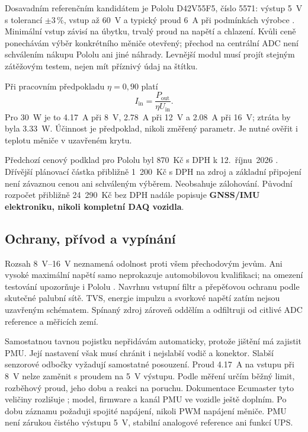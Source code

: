 Dosavadním referenčním kandidátem je Pololu D42V55F5, číslo 5571:
výstup \SI{5}{V} s tolerancí \(\pm3\,\%\), vstup až \SI{60}{V}
a typický proud \SI{6}{A} při podmínkách výrobce
\cite{pololu-d42-integrace}. Minimální vstup závisí na úbytku,
trvalý proud na napětí a chlazení. Kvůli ceně ponechávám výběr
konkrétního měniče otevřený; přechod na centrální ADC není schválením
nákupu Pololu ani jiné náhrady. Levnější modul musí projít stejným
zátěžovým testem, nejen mít příznivý údaj na štítku.

Při pracovním předpokladu $\eta=0{,}90$ platí
\begin{equation}
 I_{\mathrm{in}}=\frac{P_{\mathrm{out}}}{\eta U_{\mathrm{in}}}.
\end{equation}
Pro \SI{30}{W} je to \SI{4.17}{A} při \SI{8}{V}, \SI{2.78}{A}
při \SI{12}{V} a \SI{2.08}{A} při \SI{16}{V}; ztráta by byla
\SI{3.33}{W}. Účinnost je předpoklad, nikoli změřený parametr.
Je nutné ověřit i teplotu měniče v uzavřeném krytu.

Předchozí cenový podklad pro Pololu byl 870~Kč s DPH k
12.~říjnu~2026 \cite{botland-pololu-integrace}. Dřívější plánovací
částka přibližně 1~200~Kč s DPH na zdroj a základní připojení
není závaznou cenou ani schváleným výběrem. Neobsahuje zálohování.
Původní rozpočet přibližně 24~290~Kč bez DPH nadále popisuje
\textbf{GNSS/IMU elektroniku, nikoli kompletní DAQ vozidla}.

\subsection{Ochrany, přívod a vypínání}

Rozsah \SIrange{8}{16}{V} neznamená odolnost proti všem přechodovým
jevům. Ani vysoké maximální napětí samo neprokazuje automobilovou
kvalifikaci; na omezení testování upozorňuje i Pololu
\cite{pololu-auto-integrace}. Navrhnu vstupní filtr a přepěťovou
ochranu podle skutečné palubní sítě. TVS, energie impulzu a svorkové
napětí zatím nejsou uzavřeným schématem. Spínaný zdroj zároveň
oddělím a odfiltruji od citlivé ADC reference a měřicích zemí.

Samostatnou tavnou pojistku nepřidávám automaticky, protože jištění
má zajistit PMU. Její nastavení však musí chránit i nejslabší vodič
a konektor. Slabší senzorové odbočky vyžadují samostatné posouzení.
Proud \SI{4.17}{A} na vstupu při \SI{8}{V} nelze zaměnit s proudem
na \SI{5}{V} výstupu. Podle měření určím běžný limit, rozběhový proud,
jeho dobu a reakci na poruchu. Dokumentace Ecumaster tyto veličiny
rozlišuje \cite{ecumaster-pmu-integrace}; model, firmware a kanál
PMU ve vozidle ještě doplním. Po dobu záznamu požaduji spojité
napájení, nikoli PWM napájení měniče. PMU není zárukou čistého
výstupu \SI{5}{V}, stabilní analogové reference ani funkcí UPS.

